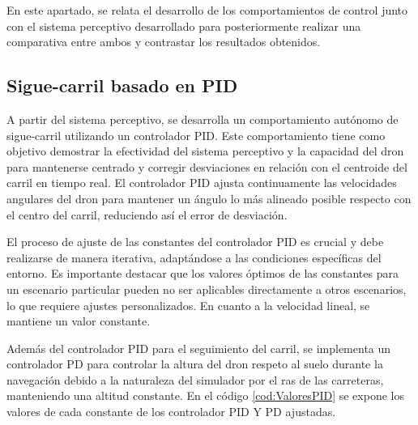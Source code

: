   En este apartado, se relata el desarrollo de los comportamientos de control junto con el sistema perceptivo desarrollado para posteriormente realizar 
  una comparativa entre ambos y contrastar los resultados obtenidos.

\subsection{Sigue-carril basado en PID}
\label{sec:Control}

A partir del sistema perceptivo, se desarrolla un comportamiento autónomo de sigue-carril utilizando un controlador PID. Este comportamiento tiene como objetivo
demostrar la efectividad del sistema perceptivo y la capacidad del dron para mantenerse centrado y corregir desviaciones en relación
con el centroide del carril en tiempo real. El controlador PID ajusta continuamente las velocidades angulares del dron para mantener un ángulo lo más alineado posible respecto con el
centro del carril, reduciendo así el error de desviación.

El proceso de ajuste de las constantes del controlador PID es crucial y debe realizarse de manera iterativa, adaptándose a las condiciones específicas del entorno. Es importante
destacar que los valores óptimos de las constantes para un escenario particular pueden no ser aplicables directamente a otros escenarios, lo que requiere ajustes personalizados. 
En cuanto a la velocidad lineal, se mantiene un valor constante.\newline

Además del controlador PID para el seguimiento del carril, se implementa un controlador PD para controlar la altura del dron respeto al suelo durante la navegación debido a la naturaleza
del simulador por el ras de las carreteras, manteniendo una altitud constante. En el código \ref{cod:ValoresPID} se expone los valores de cada constante de los controlador PID Y PD ajustadas. \newline

